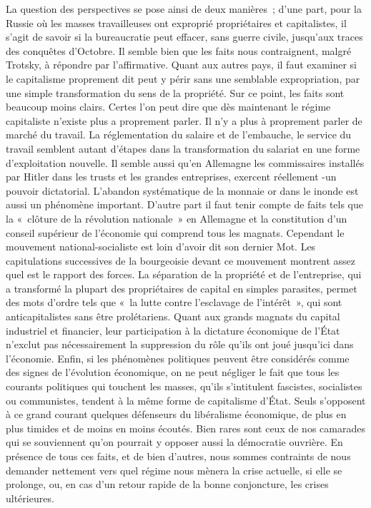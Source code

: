 \documentclass[french,twoside]{book} %
\begin{document}
La question des perspectives se pose ainsi de deux manières ; d'une part, pour la Russie où les masses travailleuses ont exproprié propriétaires et capitalistes, il s'agit de savoir si la bureaucratie peut effacer, sans guerre civile, jusqu'aux traces des conquêtes d'Octobre. Il semble bien que les faits nous contraignent, malgré Trotsky, à répondre par l'affirmative. Quant aux autres pays, il faut examiner si le capitalisme proprement dit peut y périr sans une semblable expropriation, par une simple transformation du sens de la propriété. Sur ce point, les faits sont beaucoup moins clairs. Certes l'on peut dire que dès maintenant le régime capitaliste n'existe plus a proprement parler. Il n'y a plus à proprement parler de marché du travail. La réglementation du salaire et de l'embauche, le service du travail semblent autant d'étapes dans la transformation du salariat en une forme d'exploitation nouvelle. Il semble aussi qu'en Allemagne les commissaires installés par Hitler dans les trusts et les grandes entreprises, exercent réellement -un pouvoir dictatorial. L'abandon systématique de la monnaie or dans le inonde est aussi un phénomène important. D'autre part il faut tenir compte de faits tels que la « clôture de la révolution nationale » en Allemagne et la constitution d'un conseil supérieur de l'économie qui comprend tous les magnats. Cependant le mouvement national-socialiste est loin d'avoir dit son dernier Mot. Les capitulations successives de la bourgeoisie devant ce mouvement montrent assez quel est le rapport des forces. La séparation de la propriété et de l'entreprise, qui a transformé la plupart des propriétaires de capital en simples parasites, permet des mots d'ordre tels que « la lutte contre l'esclavage de l'intérêt », qui sont anticapitalistes sans être prolétariens. Quant aux grands magnats du capital industriel et financier, leur participation à la dictature économique de l'État n'exclut pas nécessairement la suppression du rôle qu'ils ont joué jusqu'ici dans l'économie. Enfin, si les phénomènes politiques peuvent être considérés comme des signes de l'évolution économique, on ne peut négliger le fait que tous les courants politiques qui touchent les masses, qu'ils s'intitulent fascistes, socialistes ou communistes, tendent à la même forme de capitalisme d'État. Seuls s'opposent à ce grand courant quelques défenseurs du libéralisme économique, de plus en plus timides et de moins en moins écoutés. Bien rares sont ceux de nos camarades qui se souviennent qu'on pourrait y opposer aussi la démocratie ouvrière. En présence de tous ces faits, et de bien d'autres, nous sommes contraints de nous demander nettement vers quel régime nous mènera la crise actuelle, si elle se prolonge, ou, en cas d'un retour rapide de la bonne conjoncture, les crises ultérieures.\par
\end{document}
